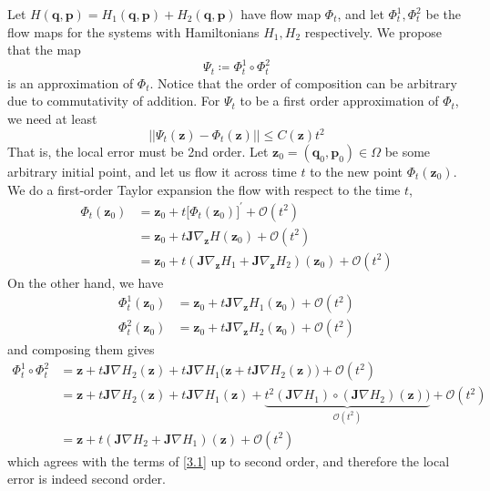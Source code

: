 \documentclass{article}
\begin{document}
    Let $H(\mathbf{q}, \mathbf{p}) = H_1 (\mathbf{q}, \mathbf{p}) + H_2 (\mathbf{q}, \mathbf{p})$ have flow map $\Phi_t$, and let $\Phi_t^1, \Phi_t^2$ be the flow maps for the systems with Hamiltonians $H_1, H_2$ respectively. We propose that the map 
    \[\Psi_t \coloneqq \Phi_t^1 \circ \Phi_t^2\]
    is an approximation of $\Phi_t$. Notice that the order of composition can be arbitrary due to commutativity of addition. For $\Psi_t$ to be a first order approximation of $\Phi_t$, we need at least 
    \[||\Psi_t (\mathbf{z}) - \Phi_t (\mathbf{z}) || \leq C(\mathbf{z}) t^2\]
    That is, the local error must be 2nd order. Let $\mathbf{z}_0 = (\mathbf{q}_0, \mathbf{p}_0) \in \Omega$ be some arbitrary initial point, and let us flow it across time $t$ to the new point $\Phi_t (\mathbf{z}_0)$. We do a first-order Taylor expansion the flow with respect to the time $t$, 
    \begin{align*}
        \Phi_t (\mathbf{z}_0) & = \mathbf{z}_0 + t \big[\Phi_t (\mathbf{z}_0)\big]^\prime + \mathcal{O}(t^2) \\
        & = \mathbf{z}_0 + t \mathbf{J} \nabla_\mathbf{z} H(\mathbf{z}_0) + \mathcal{O}(t^2) \\
        & = \mathbf{z}_0 + t (\mathbf{J} \nabla_\mathbf{z} H_1 + \mathbf{J} \nabla_\mathbf{z} H_2) (\mathbf{z}_0) + \mathcal{O}(t^2) \tag{3.1} \label{3.1}
    \end{align*}
    On the other hand, we have
    \begin{align*}
        \Phi_t^1 (\mathbf{z}_0) & = \mathbf{z}_0 + t \mathbf{J} \nabla_\mathbf{z} H_1 (\mathbf{z}_0) + \mathcal{O}(t^2) \\
        \Phi_t^2 (\mathbf{z}_0) & = \mathbf{z}_0 + t \mathbf{J} \nabla_\mathbf{z} H_2 (\mathbf{z}_0) + \mathcal{O}(t^2) 
    \end{align*}
    and composing them gives 
    \begin{align*}
        \Phi_t^1 \circ \Phi_t^2 & = \mathbf{z} + t \mathbf{J} \nabla H_2 (\mathbf{z}) + t\mathbf{J} \nabla H_1 \big( \mathbf{z} + t \mathbf{J} \nabla H_2 (\mathbf{z}) \big) + \mathcal{O}(t^2) \\
        & = \mathbf{z} + t \mathbf{J} \nabla H_2 (\mathbf{z}) + t \mathbf{J} \nabla H_1 (\mathbf{z}) + \underbrace{t^2 (\mathbf{J} \nabla H_1) \circ (\mathbf{J} \nabla H_2)  (\mathbf{z})\big)}_{\mathcal{O}(t^2)} + \mathcal{O}(t^2) \\
        & = \mathbf{z} + t (\mathbf{J} \nabla H_2 + \mathbf{J} \nabla H_1) (\mathbf{z}) + \mathcal{O}(t^2)
    \end{align*}
    which agrees with the terms of \eqref{3.1} up to second order, and therefore the local error is indeed second order. 
\end{document}
